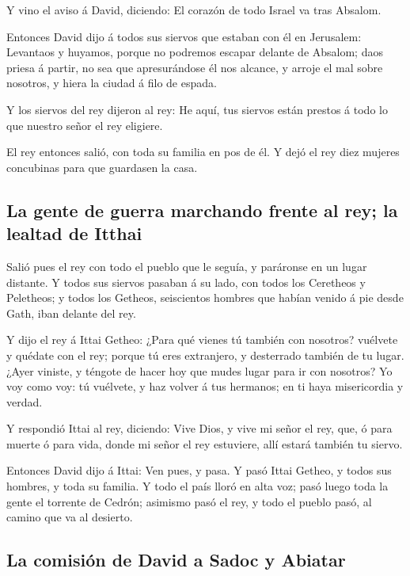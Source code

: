  Y vino el aviso á David, diciendo: El corazón de todo
Israel va tras Absalom.

 Entonces David dijo á todos sus siervos que estaban con él
en Jerusalem: Levantaos y huyamos, porque no podremos escapar delante de
Absalom; daos priesa á partir, no sea que apresurándose él nos alcance,
y arroje el mal sobre nosotros, y hiera la ciudad á filo de espada.

 Y los siervos del rey dijeron al rey: He aquí, tus siervos
están prestos á todo lo que nuestro señor el rey eligiere.

 El rey entonces salió, con toda su familia en pos de él. Y
dejó el rey diez mujeres concubinas para que guardasen la casa.

\hypertarget{la-gente-de-guerra-marchando-frente-al-rey-la-lealtad-de-itthai}{%
\subsection{La gente de guerra marchando frente al rey; la lealtad de
Itthai}\label{la-gente-de-guerra-marchando-frente-al-rey-la-lealtad-de-itthai}}

 Salió pues el rey con todo el pueblo que le seguía, y
paráronse en un lugar distante.  Y todos sus siervos
pasaban á su lado, con todos los Ceretheos y Peletheos; y todos los
Getheos, seiscientos hombres que habían venido á pie desde Gath, iban
delante del rey.

 Y dijo el rey á Ittai Getheo: ¿Para qué vienes tú también
con nosotros? vuélvete y quédate con el rey; porque tú eres extranjero,
y desterrado también de tu lugar.  ¿Ayer viniste, y téngote
de hacer hoy que mudes lugar para ir con nosotros? Yo voy como voy: tú
vuélvete, y haz volver á tus hermanos; en ti haya misericordia y verdad.

 Y respondió Ittai al rey, diciendo: Vive Dios, y vive mi
señor el rey, que, ó para muerte ó para vida, donde mi señor el rey
estuviere, allí estará también tu siervo.

 Entonces David dijo á Ittai: Ven pues, y pasa. Y pasó
Ittai Getheo, y todos sus hombres, y toda su familia.  Y
todo el país lloró en alta voz; pasó luego toda la gente el torrente de
Cedrón; asimismo pasó el rey, y todo el pueblo pasó, al camino que va al
desierto.

\hypertarget{la-comisiuxf3n-de-david-a-sadoc-y-abiatar}{%
\subsection{La comisión de David a Sadoc y
Abiatar}\label{la-comisiuxf3n-de-david-a-sadoc-y-abiatar}}


